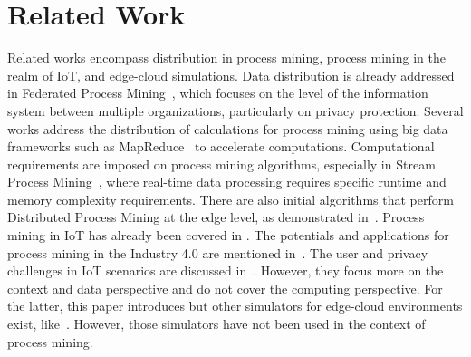 \section{Related Work}
Related works encompass distribution in process mining, process mining in the realm of IoT, and edge-cloud simulations. Data distribution is already addressed in Federated Process Mining~\cite{FederatedPM,FederatedPM2}, which focuses on the level of the information system between multiple organizations, particularly on privacy protection. Several works address the distribution of calculations for process mining using big data frameworks such as MapReduce~\cite{MapReduce,FHM} to accelerate computations. Computational requirements are imposed on process mining algorithms, especially in Stream Process Mining~\cite{Burattin2022}, where real-time data processing requires specific runtime and memory complexity requirements. There are also initial algorithms that perform Distributed Process Mining at the edge level, as demonstrated in~\cite{Andersen}. Process mining in IoT has already been covered in \cite{Bertrand2022}. The potentials and applications for process mining in the Industry 4.0 are mentioned in~\cite{Osman2019,Vila2023}. The user and privacy challenges in IoT scenarios are discussed in~\cite{Michael2019}. However, they focus more on the context and data perspective and do not cover the computing perspective. For the latter, this paper introduces \name but other simulators for edge-cloud environments exist, like~\cite{Mass2020,Jha2020,Mechalikh2021}. However, those simulators have not been used in the context of process mining.